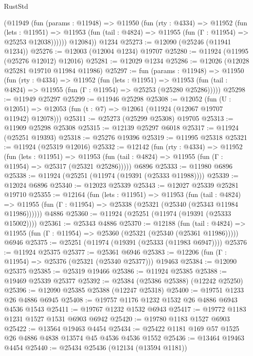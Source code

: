 \begin{lexlean}{RustStd}
\begin{coremodule}
{\begin{coremodule}
{{{{{{{{{{{{{{{{{{{{{{{{{{{{{{{{{{{{{{{{{{{{{{{{{{{{{{{{{{{{{{{{{{{{{{{{{{{{{{{{        (@11949
          (fun (params : @11948) =>
          @11950
            (fun (rty : @4334) =>
            @11952
              (fun (lets : @11951) =>
              @11953 (fun (tail : @4824) => @11955 (fun (Γ : @11954) => @25253 @12038))))))
        @12084))
    @1234
@25273 := @12090 (@25246 (@11941 @1234))
@25276 := @12003 (@12004 @1234) @19707
@25280 := @11924 (@11995 (@25276 @12012) @12016)
@25281 := @12029 @1234
@25286 := @12026 (@12028 @25281 @19710 @11984 @11986)
@25297 := fun (params : @11948) =>
  @11950
    (fun (rty : @4334) =>
    @11952
      (fun (lets : @11951) =>
      @11953 (fun (tail : @4824) => @11955 (fun (Γ : @11954) => @25253 (@25280 @25286)))))
@25298 := @11949 @25297
@25299 := @11946 @25298
@25308 := @12052
    (fun (U : @12051) => @12053 (fun (t : @7) => @12061 (@11924 (@12067 @19707 @11942) @12078)))
@25311 := @25273 (@25299 @25308) @19705
@25313 := @11909 @25298 @25308
@25315 := @12139 @25297 @6018
@25317 := @11924 (@25251 @19393)
@25318 := @25276 @19396
@25319 := @11995 @25318
@25321 := @11924 (@25319 @12016)
@25332 := @12142
    (fun (rty : @4334) =>
    @11952
      (fun (lets : @11951) =>
      @11953 (fun (tail : @4824) => @11955 (fun (Γ : @11954) => @25317 (@25321 @25286)))))
    @6896
@25333 := @11980 @6896
@25338 := @11924 (@25251 (@11974 (@19391 (@25333 @11988))))
@25339 := @12024 @6896
@25340 := @12023 @25339
@25343 := @12027 @25339 @25281 @19710
@25355 := @12164
    (fun (lets : @11951) =>
    @11953
      (fun (tail : @4824) =>
      @11955 (fun (Γ : @11954) => @25338 (@25321 (@25340 (@25343 @11984 @11986))))))
    @4886
@25360 := @11924 (@25251 (@11974 (@19391 (@25333 @15002))))
@25361 := @25343 @4886
@25370 := @12188
    (fun (tail : @4824) => @11955 (fun (Γ : @11954) => @25360 (@25321 (@25340 (@25361 @11986)))))
    @6946
@25375 := @25251 (@11974 (@19391 (@25333 (@11983 @6947))))
@25376 := @11924 @25375
@25377 := @25361 @6946
@25383 := @12206 (fun (Γ : @11954) => @25376 (@25321 (@25340 @25377))) @19463
@25384 := @12090 @25375
@25385 := @25319 @19466
@25386 := @11924 @25385
@25388 := @19469 @25339 @25377
@25392 := @25384 (@25386 @25388) (@12242 @25250)
@25396 := @12090 @25385 @25388 (@12247 @25318)
@25400 := @19751 @1233 @26 @4886 @6945
@25408 := @19757 @1176 @1232 @1532 @26 @4886 @6943 @4536 @1543
@25411 := @19767 @1232 @1532 @6943
@25417 := @19772 @1183 @1231 @1527 @1531 @6903 @6942
@25420 := @19780 @1183 @1527 @6903
@25422 := @13564 @19463 @4454
@25434 := @25422 @1181 @169 @57 @1525 @26 @4886 @4838 @13574 @45 @4536 @4536 @1552
@25436 := @13464 @19463 @4454
@25440 := @25434 @25436 (@12134 (@13594 @1181))
}}}}}}}}}}}}}}}}}}}}}}}}}}}}}}}}}}}}}}}}}}}}}}}}}}}}}}}}}}}}}}}}}}}}}}}}}}}}}}}}
\end{coremodule}}
\end{coremodule}
\end{lexlean}

